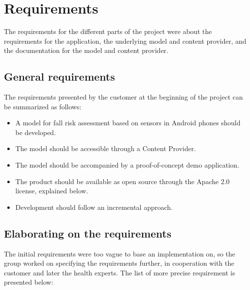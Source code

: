 \chapter{Requirements}
The requirements for the different parts of the project were about the requirements for the application, the underlying model and content provider, and the documentation for the model and content provider. 

\section{General requirements}
The requirements presented by the customer at the beginning of the project can be summarized as follows:

\begin{itemize}
\item A model for fall risk assessment based on sensors in Android phones should be developed.
\item The model should be accessible through a Content Provider.
\item The model should be accompanied by a proof-of-concept demo application.
\item The product should be available as open source through the Apache 2.0 license, explained below.
\item Development should follow an incremental approach.
\end{itemize}

\section{Elaborating on the requirements}
The initial requirements were too vague to base an implementation on, so the group worked on specifying the requirements further, in cooperation with the customer and later the health experts. The list of more precise requirement is presented below:

